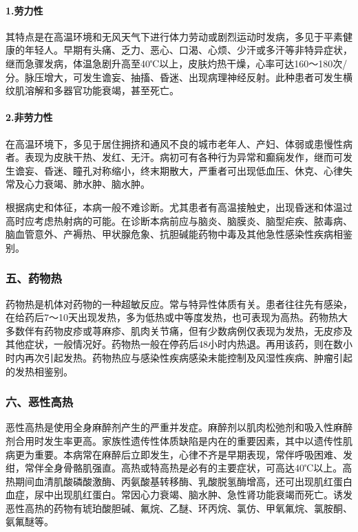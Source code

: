 \paragraph{1.劳力性}

其特点是在高温环境和无风天气下进行体力劳动或剧烈运动时发病，多见于平素健康的年轻人。早期有头痛、乏力、恶心、口渴、心烦、少汗或多汗等非特异症状，继而急骤发病，体温急剧升高至40℃以上，皮肤灼热干燥，心率可达160～180次/分。脉压增大，可发生谵妄、抽搐、昏迷、出现病理神经反射。此种患者可发生横纹肌溶解和多器官功能衰竭，甚至死亡。

\paragraph{2.非劳力性}

在高温环境下，多见于居住拥挤和通风不良的城市老年人、产妇、体弱或患慢性病者。表现为皮肤干热、发红、无汗。病初可有各种行为异常和癫痫发作，继而可发生谵妄、昏迷、瞳孔对称缩小，终末期散大，严重者可出现低血压、休克、心律失常及心力衰竭、肺水肿、脑水肿。

根据病史和体征，本病一般不难诊断。尤其患者有高温接触史，出现昏迷和体温过高时应考虑热射病的可能。在诊断本病前应与脑炎、脑膜炎、脑型疟疾、脓毒病、脑血管意外、产褥热、甲状腺危象、抗胆碱能药物中毒及其他急性感染性疾病相鉴别。

\subsubsection{五、药物热}

药物热是机体对药物的一种超敏反应。常与特异性体质有关。患者往往先有感染，在给药后7～10天出现发热，多为低热或中等度发热，也可表现为高热。药物热大多数伴有药物皮疹或荨麻疹、肌肉关节痛，但有少数病例仅表现为发热，无皮疹及其他症状，一般情况好。药物热一般在停药后48小时内热退。再用该药，则在数小时内再次引起发热。药物热应与感染性疾病感染未能控制及风湿性疾病、肿瘤引起的发热相鉴别。

\subsubsection{六、恶性高热}

恶性高热是使用全身麻醉剂产生的严重并发症。麻醉剂以肌肉松弛剂和吸入性麻醉剂合用时发生率更高。家族性遗传性体质缺陷是内在的重要因素，其中以遗传性肌病更为重要。本病常在麻醉后立即发生，心律不齐是早期表现，常伴呼吸困难、发绀，常伴全身骨骼肌强直。高热或特高热是必有的主要症状，可高达40℃以上。高热期间血清肌酸磷酸激酶、丙氨酸基转移酶、乳酸脱氢酶增高，还可出现肌红蛋白血症，尿中出现肌红蛋白。常因心力衰竭、脑水肿、急性肾功能衰竭而死亡。诱发恶性高热的药物有琥珀酸胆碱、氟烷、乙醚、环丙烷、氯仿、甲氧氟烷、氯胺酮、氨氟醚等。

